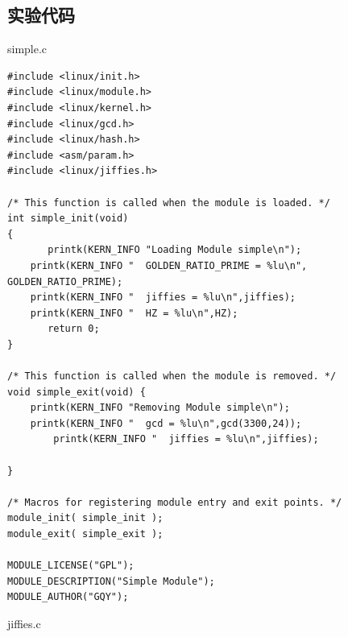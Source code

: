 \documentclass{article}
\begin{document}
\subsection{实验代码}
\begin{center}
{\ttfamily simple.c}
\end{center}
\begin{lstlisting}[language={[ANSI]C}]
#include <linux/init.h>
#include <linux/module.h>
#include <linux/kernel.h>
#include <linux/gcd.h>
#include <linux/hash.h>
#include <asm/param.h>
#include <linux/jiffies.h>

/* This function is called when the module is loaded. */
int simple_init(void)
{
       printk(KERN_INFO "Loading Module simple\n");
	printk(KERN_INFO "  GOLDEN_RATIO_PRIME = %lu\n", GOLDEN_RATIO_PRIME);
	printk(KERN_INFO "  jiffies = %lu\n",jiffies);
	printk(KERN_INFO "  HZ = %lu\n",HZ);
       return 0;
}

/* This function is called when the module is removed. */
void simple_exit(void) {
	printk(KERN_INFO "Removing Module simple\n");
	printk(KERN_INFO "  gcd = %lu\n",gcd(3300,24));
        printk(KERN_INFO "  jiffies = %lu\n",jiffies);

}

/* Macros for registering module entry and exit points. */
module_init( simple_init );
module_exit( simple_exit );

MODULE_LICENSE("GPL");
MODULE_DESCRIPTION("Simple Module");
MODULE_AUTHOR("GQY");
\end{lstlisting}
\begin{center}
{\ttfamily jiffies.c}
\end{center}
\end{document}
